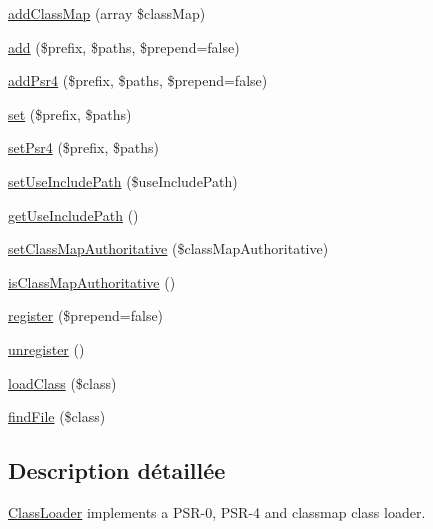 \begin{DoxyCompactItemize}
\item 
\hyperlink{class_composer_1_1_autoload_1_1_class_loader_a164966b8bcb9bf5470152bb5707a28af}{add\+Class\+Map} (array \$class\+Map)
\item 
\hyperlink{class_composer_1_1_autoload_1_1_class_loader_a5c0f76dc6dde6d1209d78b2fa27db0af}{add} (\$prefix, \$paths, \$prepend=false)
\item 
\hyperlink{class_composer_1_1_autoload_1_1_class_loader_a264d8845526646ebc3725f219949baca}{add\+Psr4} (\$prefix, \$paths, \$prepend=false)
\item 
\hyperlink{class_composer_1_1_autoload_1_1_class_loader_a558e395314f41f94b501b189ae74dcae}{set} (\$prefix, \$paths)
\item 
\hyperlink{class_composer_1_1_autoload_1_1_class_loader_a7f92172519c08357430e7da877a88995}{set\+Psr4} (\$prefix, \$paths)
\item 
\hyperlink{class_composer_1_1_autoload_1_1_class_loader_aed3e96782322ebc7352f1e62de1cc38c}{set\+Use\+Include\+Path} (\$use\+Include\+Path)
\item 
\hyperlink{class_composer_1_1_autoload_1_1_class_loader_a21c8a2ce47b9ab8184cce5949496414c}{get\+Use\+Include\+Path} ()
\item 
\hyperlink{class_composer_1_1_autoload_1_1_class_loader_aa3d6610396da6f5bef836d4fc5547816}{set\+Class\+Map\+Authoritative} (\$class\+Map\+Authoritative)
\item 
\hyperlink{class_composer_1_1_autoload_1_1_class_loader_a5187f29c880def2863b3592d2cce5844}{is\+Class\+Map\+Authoritative} ()
\item 
\hyperlink{class_composer_1_1_autoload_1_1_class_loader_a3968965f178f6a5ef212b31b72231e69}{register} (\$prepend=false)
\item 
\hyperlink{class_composer_1_1_autoload_1_1_class_loader_a501cedfa611556a0100e024a0e102d9d}{unregister} ()
\item 
\hyperlink{class_composer_1_1_autoload_1_1_class_loader_a8326a997d0cfe76d80196f60d240d144}{load\+Class} (\$class)
\item 
\hyperlink{class_composer_1_1_autoload_1_1_class_loader_a4f8534c9205630e4b9c61e47ebf2867a}{find\+File} (\$class)
\end{DoxyCompactItemize}


\subsection{Description détaillée}
\hyperlink{class_composer_1_1_autoload_1_1_class_loader}{Class\+Loader} implements a P\+S\+R-\/0, P\+S\+R-\/4 and classmap class loader. 


